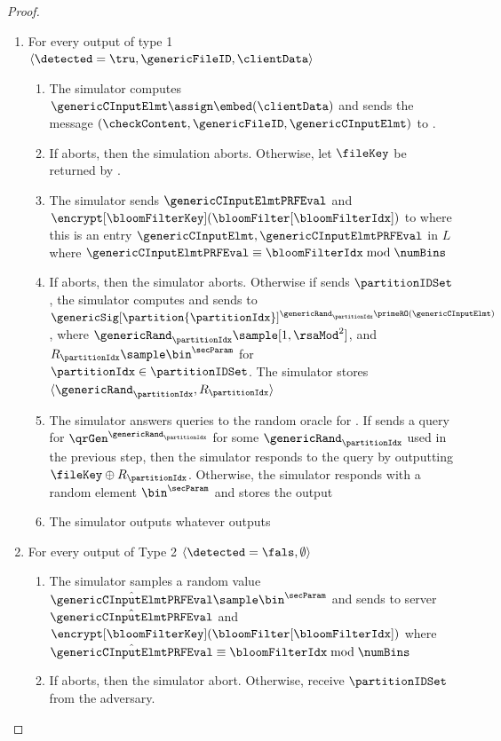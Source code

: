 \begin{proof}
\begin{itemize}
\begin{enumerate}[resume]
\item For every output of type 1 $\langle \detected = \tru, \genericFileID, \clientData \rangle$
\begin{enumerate}
\item The simulator computes $\genericCInputElmt \assign \embed(\clientData)$ and sends the message $(\checkContent, \genericFileID, \genericCInputElmt)$ to \contentModFunc. 
\item If \contentModFunc aborts, then the simulation aborts. Otherwise, let $\fileKey$ be returned by \contentModFunc. 
\item The simulator sends $\genericCInputElmtPRFEval$ and $\encrypt[\bloomFilterKey](\bloomFilter[\bloomFilterIdx])$ to \server where this is an entry $\genericCInputElmt, \genericCInputElmtPRFEval$ in $L$ where $\genericCInputElmtPRFEval \equiv \bloomFilterIdx \bmod \numBins$ 
\item If \server aborts, then the simulator aborts. Otherwise if \server sends $\partitionIDSet$, the simulator computes and sends to \server $\genericSig[\partition{\partitionIdx}]^{\genericRand_\partitionIdx \primeRO(\genericCInputElmt)}$, where $\genericRand_\partitionIdx \sample [1, \rsaMod^2]$, and $R_\partitionIdx \sample \bin^{\secParam}$ for $\partitionIdx \in \partitionIDSet$. The simulator stores $\langle \genericRand_\partitionIdx, R_\partitionIdx \rangle$
\item The simulator answers queries to the random oracle \ro for \server. If \server sends a query for $\qrGen^{\genericRand_\partitionIdx}$ for some $\genericRand_\partitionIdx$ used in the previous step, then the simulator responds to the query by outputting $\fileKey \oplus R_\partitionIdx$. Otherwise, the simulator responds with a random element $\bin^{\secParam}$ and stores the output
\item The simulator outputs whatever \server outputs
\end{enumerate}
\item For every output of Type 2 $\langle \detected = \fals, \emptyset \rangle$
\begin{enumerate}
\item The simulator samples a random value $\hat{\genericCInputElmtPRFEval} \sample \bin^{\secParam}$ and sends to server $\hat{\genericCInputElmtPRFEval}$ and $\encrypt[\bloomFilterKey](\bloomFilter[\bloomFilterIdx])$ where $\hat{\genericCInputElmtPRFEval} \equiv \bloomFilterIdx \bmod \numBins$ 
\item If \server aborts, then the simulator abort. Otherwise, receive $\partitionIDSet$ from the adversary. 

\end{enumerate}
\end{enumerate}
\end{itemize}
\end{proof}
